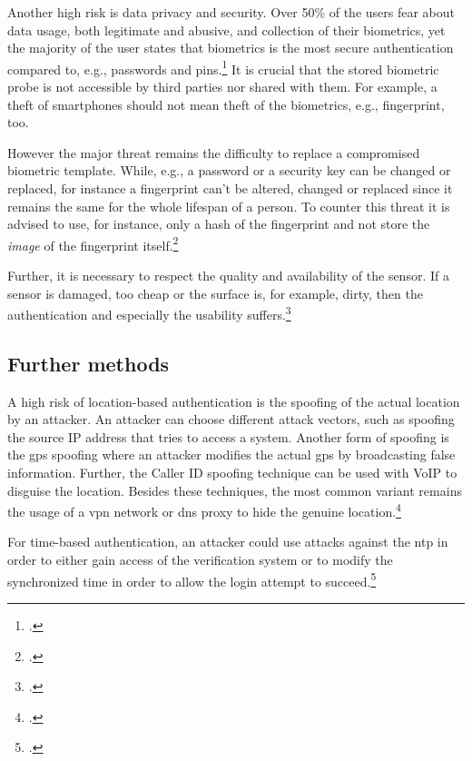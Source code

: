 Another high risk is data privacy and security. Over 50\% of the users fear about data usage, both legitimate and abusive, and collection of their biometrics, yet the majority of the user states that biometrics is the most secure authentication compared to, e.g., passwords and \glspl{pin}.\footcite[See][8]{ibm-security} It is crucial that the stored biometric probe is not accessible by third parties nor shared with them. For example, a theft of smartphones should not mean theft of the biometrics, e.g., fingerprint, too.

However the major threat remains the difficulty to replace a compromised biometric template. While, e.g., a password or a security key can be changed or replaced, for instance a fingerprint can't be altered, changed or replaced since it remains the same for the whole lifespan of a person. To counter this threat it is advised to use, for instance, only a hash of the fingerprint and not store the \textit{image} of the fingerprint itself.\footcite[See][266]{shostack2014threat}

Further, it is necessary to respect the quality and availability of the sensor. If a sensor is damaged, too cheap or the surface is, for example, dirty, then the authentication and especially the usability suffers.\footcite[See][37]{265831}

\subsection{Further methods}

A high risk of location-based authentication is the spoofing of the actual location by an attacker. An attacker can choose different attack vectors, such as spoofing the source IP address that tries to access a system. Another form of spoofing is the \gls{gps} spoofing where an attacker modifies the actual \gls{gps} by broadcasting false information. Further, the Caller ID spoofing technique can be used with VoIP to disguise the location. Besides these techniques, the most common variant remains the usage of a \gls{vpn} network or \gls{dns} proxy to hide the genuine location.\footcites[See][138--145]{517355}[See][Chapter 4.5.3]{30270}[See][115--116,133]{eckert-it-sec-9}

For time-based authentication, an attacker could use attacks against the \gls{ntp} in order to either gain access of the verification system or to modify the synchronized time in order to allow the login attempt to succeed.\footcite[See][]{malhotraattacking}

